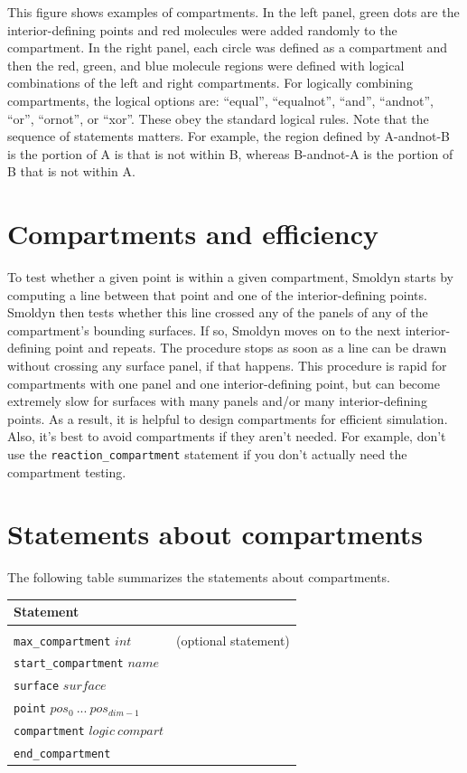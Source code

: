 \documentclass {scrbook}
\newcommand {\ttt} {\texttt}
\begin{document}
This figure shows examples of compartments. In the left panel, green dots are the interior-defining points and red molecules were added randomly to the compartment. In the right panel, each circle was defined as a compartment and then the red, green, and blue molecule regions were defined with logical combinations of the left and right compartments.
For logically combining compartments, the logical options are: ``equal'', ``equalnot'', ``and'', ``andnot'', ``or'', ``ornot'', or ``xor''. These obey the standard logical rules. Note that the sequence of statements matters. For example, the region defined by A-andnot-B is the portion of A is that is not within B, whereas B-andnot-A is the portion of B that is not within A.

\section{Compartments and efficiency}

To test whether a given point is within a given compartment, Smoldyn starts by computing a line between that point and one of the interior-defining points. Smoldyn then tests whether this line crossed any of the panels of any of the compartment's bounding surfaces. If so, Smoldyn moves on to the next interior-defining point and repeats. The procedure stops as soon as a line can be drawn without crossing any surface panel, if that happens. This procedure is rapid for compartments with one panel and one interior-defining point, but can become extremely slow for surfaces with many panels and/or many interior-defining points. As a result, it is helpful to design compartments for efficient simulation. Also, it's best to avoid compartments if they aren't needed. For example, don't use the \ttt{reaction\_compartment} statement if you don't actually need the compartment testing.

\section{Statements about compartments}

The following table summarizes the statements about compartments.

\begin{longtable}[c]{ll}
Statement\\
\hline \\
\ttt{max\_compartment} $int$ & (optional statement)\\
\ttt{start\_compartment} $name$\\
\ttt{surface} $surface$\\
\ttt{point} $pos_0\ ...\ pos_{dim-1}$\\
\ttt{compartment} $logic\ compart$\\
\ttt{end\_compartment}
\end{longtable}
\end{document}
